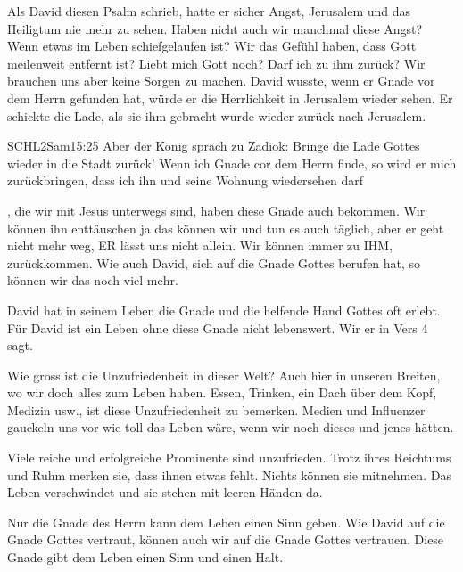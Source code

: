 \documentclass[14pt]{../../inc/mybib}
\begin{document}
    \begin{block}
        Als David diesen Psalm schrieb, hatte er sicher Angst, Jerusalem und das Heiligtum nie mehr zu sehen. Haben nicht auch wir manchmal diese Angst? Wenn etwas im Leben schiefgelaufen ist? Wir das Gefühl haben, dass Gott meilenweit entfernt ist? Liebt mich Gott noch? Darf ich zu ihm zurück? Wir brauchen uns aber keine Sorgen zu machen. David wusste, wenn er Gnade vor dem Herrn gefunden hat, würde er die Herrlichkeit in Jerusalem wieder sehen. Er schickte die Lade, als sie ihm gebracht wurde wieder zurück nach Jerusalem.
        \begin{bibelbox}{SCHL}{2Sam}{15:25}
            Aber der König sprach zu Zadiok: Bringe die Lade Gottes wieder in die Stadt zurück! Wenn ich Gnade cor dem Herrn finde, so wird er mich zurückbringen, dass ich ihn und seine Wohnung wiedersehen darf
        \end{bibelbox}
        , die wir mit Jesus unterwegs sind, haben diese Gnade auch bekommen. Wir können ihn enttäuschen ja das können wir und tun es auch täglich, aber er geht nicht mehr weg, ER lässt uns nicht allein. Wir können immer zu IHM,  zurückkommen. Wie auch David, sich auf die Gnade Gottes berufen hat, so können wir das noch viel mehr.
    \end{block}

    \begin{block}
        David hat in seinem Leben die Gnade und die helfende Hand Gottes oft erlebt. Für David ist ein Leben ohne diese Gnade nicht lebenswert. Wir er in Vers 4 sagt.

        Wie gross ist die Unzufriedenheit in dieser Welt? Auch hier in unseren Breiten, wo wir doch alles zum Leben haben. Essen, Trinken, ein Dach über dem Kopf, Medizin usw., ist diese Unzufriedenheit zu bemerken. Medien und Influenzer gauckeln uns vor wie toll das Leben wäre, wenn wir noch dieses und jenes hätten.
        
        Viele reiche und erfolgreiche Prominente sind unzufrieden. Trotz ihres Reichtums und Ruhm merken sie, dass ihnen etwas fehlt. Nichts können sie mitnehmen. Das Leben verschwindet und sie stehen mit leeren Händen da.
        
        Nur die Gnade des Herrn kann dem Leben einen Sinn geben. Wie David auf die Gnade Gottes vertraut, können auch wir auf die Gnade Gottes vertrauen. Diese Gnade gibt dem Leben einen Sinn und einen Halt. 
    \end{block}
\end{document}
